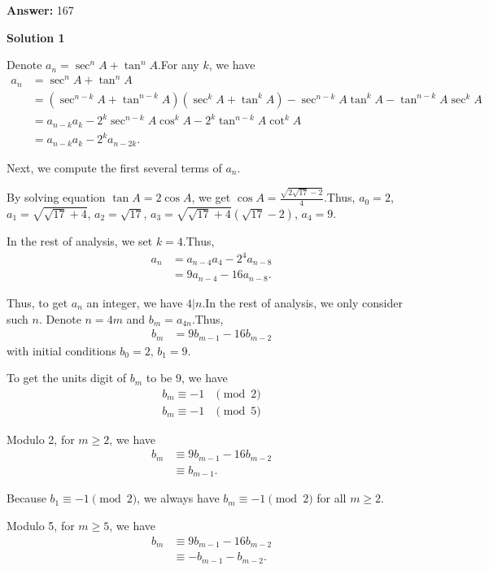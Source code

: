 \begin{enumerate}
 \textbf{Answer: }167



\textbf{Solution 1}

Denote $a_n = \sec^n A + \tan^n A$.For any $k$, we have
 \begin{align*} a_n & = \sec^n A + \tan^n A \\ & = \left( \sec^{n-k} A + \tan^{n-k} A \right) \left( \sec^k A + \tan^k A \right) - \sec^{n-k} A \tan^k A - \tan^{n-k} A \sec^k A \\ & = a_{n-k} a_k - 2^k \sec^{n-k} A \cos^k A - 2^k \tan^{n-k} A \cot^k A \\ & = a_{n-k} a_k - 2^k a_{n-2k} . \end{align*}


 Next, we compute the first several terms of $a_n$.

 By solving equation $\tan A = 2 \cos A$, we get $\cos A = \frac{\sqrt{2 \sqrt{17} - 2}}{4}$.Thus, $a_0 = 2$, $a_1 = \sqrt{\sqrt{17} + 4}$, $a_2 = \sqrt{17}$, $a_3 = \sqrt{\sqrt{17} + 4} \left( \sqrt{17} - 2 \right)$, $a_4 = 9$.

 In the rest of analysis, we set $k = 4$.Thus,
 \begin{align*} a_n & = a_{n-4} a_4 - 2^4 a_{n-8}  \\ & = 9 a_{n-4} - 16 a_{n-8} . \end{align*}


 Thus, to get $a_n$ an integer, we have $4 | n$.In the rest of analysis, we only consider such $n$. Denote $n = 4 m$ and $b_m = a_{4n}$.Thus,
 \begin{align*} b_m & = 9 b_{m-1} - 16 b_{m-2} \end{align*}
with initial conditions $b_0 = 2$, $b_1 = 9$.

 To get the units digit of $b_m$ to be 9, we have
 \begin{align*} b_m \equiv -1 & \pmod{2} \\ b_m \equiv -1 & \pmod{5} \end{align*}


 Modulo 2, for $m \geq 2$, we have
 \begin{align*} b_m & \equiv 9 b_{m-1} - 16 b_{m-2} \\ & \equiv b_{m-1} . \end{align*}


 Because $b_1 \equiv -1 \pmod{2}$, we always have $b_m \equiv -1 \pmod{2}$ for all $m \geq 2$.

 Modulo 5, for $m \geq 5$, we have
 \begin{align*} b_m & \equiv 9 b_{m-1} - 16 b_{m-2} \\ & \equiv - b_{m-1} - b_{m-2} . \end{align*}



\end{enumerate}
